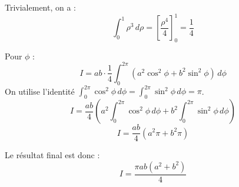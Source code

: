 \documentclass[french]{yLectureNote}
\begin{document}
Trivialement, on a :
$$\int_0^1 \rho^3 \,d\rho = \left[ \frac{\rho^4}{4} \right]_0^1 = \frac{1}{4}$$

Pour $\phi$ :
$$I = ab \cdot \frac{1}{4} \int_0^{2\pi} (a^2 \cos^2\phi + b^2 \sin^2\phi) \,d\phi$$
On utilise l'identité $\int_0^{2\pi} \cos^2\phi \,d\phi = \int_0^{2\pi} \sin^2\phi \,d\phi = \pi$.
$$I = \frac{ab}{4} \left( a^2 \int_0^{2\pi} \cos^2\phi \,d\phi + b^2 \int_0^{2\pi} \sin^2\phi \,d\phi \right)$$
$$I = \frac{ab}{4} (a^2 \pi + b^2 \pi)$$

Le résultat final est donc :
$$I = \frac{\pi ab (a^2+b^2)}{4}$$
 
\end{document}
